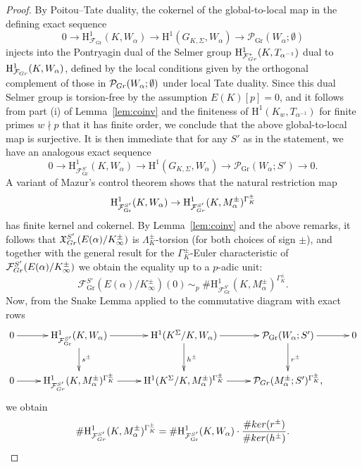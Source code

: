 \documentclass[a4paper,10pt]{amsart}
\numberwithin{equation}{section}
\numberwithin{equation}{section}
\theoremstyle{plain}
\theoremstyle{definition}
\theoremstyle{definition}
\theoremstyle{plain}
\theoremstyle{plain}
\theoremstyle{plain}
\theoremstyle{plain}
\DeclareMathOperator{\Gr}{Gr}
\newcommand{\Fcal}{\mathcal{F}}
\newcommand{\rH}{\mathrm{H}}
\begin{document}
\begin{proof} 
By Poitou--Tate duality, the cokernel of the global-to-local map in the defining exact sequence
\[
0\rightarrow\rH^1_{\Fcal_{\Gr}}(K,W_\alpha)\rightarrow\rH^1(G_{K,\Sigma},W_\alpha)\rightarrow\mathcal{P}_{\Gr}(W_\alpha;\emptyset)
\]
injects into the Pontryagin dual of the Selmer group $\rH^1_{\Fcal_{\rm Gr}^*}(K,T_{\alpha^{-1}})$ dual to $\rH^1_{\Fcal_{\rm Gr}}(K,W_\alpha)$, defined by the local conditions given by the orthogonal complement of those in $\mathcal{P}_{\rm Gr}(W_\alpha;\emptyset)$ under local Tate duality. Since this dual Selmer group is torsion-free by the assumption $E(K)[p]=0$, and it follows from part (i) of Lemma~\ref{lem:coinv} and the finiteness of $\rH^1(K_w,T_{\alpha^{-1}})$ for finite primes $w\nmid p$  that it has finite order, we conclude that the above global-to-local map is surjective. It is then immediate that for any $S'$ as in the statement, we have an analogous exact sequence
\[
0\rightarrow\rH^1_{\Fcal_{\Gr}^{S'}}(K,W_\alpha)\rightarrow\rH^1(G_{K,\Sigma},W_\alpha)\rightarrow\mathcal{P}_{\Gr}(W_\alpha;S')\rightarrow 0.
\] 
A variant of Mazur's control theorem shows that the natural restriction map
\[
\rH^1_{\Fcal_{\Gr}^{S'}}(K,W_\alpha)\rightarrow
\rH^1_{\Fcal_{\rm Gr}^{S'}}(K,M_\alpha^\pm)^{\Gamma_K^\pm}
\]
has finite kernel and cokernel. By Lemma~\ref{lem:coinv} and the above remarks, it follows that $\mathfrak{X}_{\rm Gr}^{S'}(E(\alpha)/K_\infty^\pm)$ is $\Lambda_K^\pm$-torsion (for both choices of sign $\pm$), and together with the general result \cite[Lem.\,4.2]{greenberg-cetraro} for the $\Gamma_K^\pm$-Euler characteristic of $\mathcal{F}_{\rm Gr}^{S'}(E(\alpha)/K_\infty^\pm)$ we obtain the equality up to a $p$-adic unit:
\begin{equation}\label{eq:Euler-char}
\mathcal{F}_{\Gr}^{S'}(E(\alpha)/K_\infty^\pm)(0)\,\sim_p\;\#\rH^1_{\Fcal_{\Gr}^{S'}}(K,M_\alpha^\pm)^{\Gamma_K^\pm}.
\end{equation}
Now, from the Snake Lemma applied to the commutative diagram with exact rows
\[
\xymatrix{
0\ar[r]&\rH^1_{\Fcal_{\Gr}^{S'}}(K,W_\alpha)\ar[r]\ar[d]^{s^\pm}&\rH^1(K^\Sigma/K,W_\alpha)\ar[r]\ar[d]^{h^\pm}&\mathcal{P}_{\Gr}(W_\alpha;S')\ar[r]\ar[d]^{r^\pm}&0\\
0\ar[r]&\rH^1_{\Fcal_{\rm Gr}^{S'}}(K,M_\alpha^\pm)^{\Gamma_K^\pm}\ar[r]&\rH^1(K^\Sigma/K,M_\alpha^\pm)^{\Gamma_K^\pm}\ar[r]&\mathcal{P}_{\rm Gr}(M_\alpha^\pm;S')^{\Gamma_K^\pm},
}
\]
we obtain
\begin{equation}\label{eq:snake}
\#\rH^1_{\Fcal_{\rm Gr}^{S'}}(K,M_\alpha^\pm)^{\Gamma_K^\pm}=\#\rH^1_{\Fcal_{\Gr}^{S'}}(K,W_\alpha)\cdot\frac{\#{\rm ker}(r^\pm)}{\#{\rm ker}(h^\pm)}.
\end{equation}


\end{proof}
\end{document}
